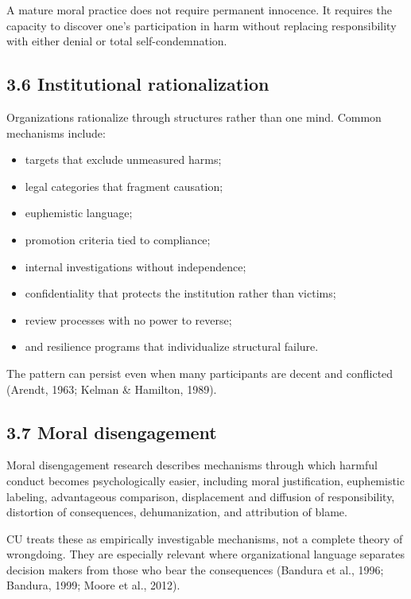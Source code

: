 \documentclass[
  11pt,
]{article}
\providecommand{\tightlist}{%
  \setlength{\itemsep}{0pt}\setlength{\parskip}{0pt}}
\begin{document}
A mature moral practice does not require permanent innocence. It
requires the capacity to discover one's participation in harm without
replacing responsibility with either denial or total self-condemnation.

\subsection{3.6 Institutional
rationalization}\label{institutional-rationalization}

Organizations rationalize through structures rather than one mind.
Common mechanisms include:

\begin{itemize}
\tightlist
\item
  targets that exclude unmeasured harms;
\item
  legal categories that fragment causation;
\item
  euphemistic language;
\item
  promotion criteria tied to compliance;
\item
  internal investigations without independence;
\item
  confidentiality that protects the institution rather than victims;
\item
  review processes with no power to reverse;
\item
  and resilience programs that individualize structural failure.
\end{itemize}

The pattern can persist even when many participants are decent and
conflicted (Arendt, 1963; Kelman \& Hamilton, 1989).

\subsection{3.7 Moral disengagement}\label{moral-disengagement}

Moral disengagement research describes mechanisms through which harmful
conduct becomes psychologically easier, including moral justification,
euphemistic labeling, advantageous comparison, displacement and
diffusion of responsibility, distortion of consequences, dehumanization,
and attribution of blame.

CU treats these as empirically investigable mechanisms, not a complete
theory of wrongdoing. They are especially relevant where organizational
language separates decision makers from those who bear the consequences
(Bandura et al., 1996; Bandura, 1999; Moore et al., 2012).
\end{document}
